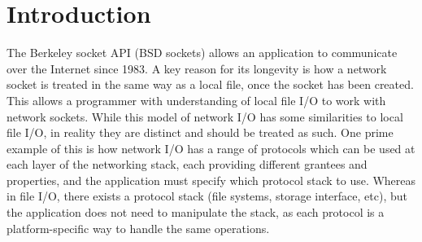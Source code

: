 \documentclass{l4proj}
\begin{document}
%
%
%
%
%
%
%
%
\chapter{Introduction}


The Berkeley socket API (BSD sockets) allows an application to communicate over the Internet since 1983.
A key reason for its longevity is how a network socket is treated in the same way as a local file, once the socket has
been created.
This allows a programmer with understanding of local file I/O to work with network sockets.
While this model of network I/O has some similarities to local file I/O, in reality they are distinct and should be
treated as such.
One prime example of this is how network I/O has a range of protocols which can be used at each layer of the networking
stack, each providing different grantees and properties, and the application must specify which protocol stack to use.
Whereas in file I/O, there exists a protocol stack (file systems, storage interface, etc), but the application does not
need to manipulate the stack, as each protocol is a platform-specific way to handle the same operations.
\end{document}

